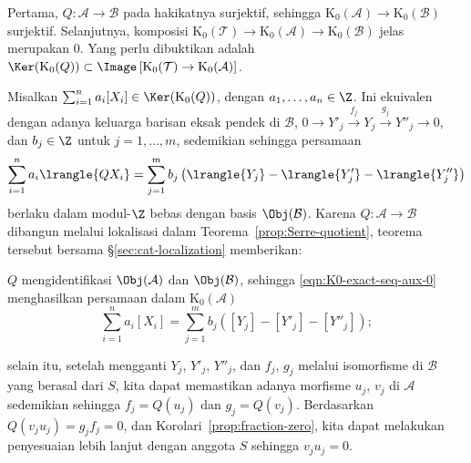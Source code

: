 \begin{bukti}
Pertama, $Q:\mathcal{A}\to\mathcal{B}$ pada hakikatnya surjektif, sehingga
$\mathrm{K}_0(\mathcal{A})\to\mathrm{K}_0(\mathcal{B})$ surjektif.
Selanjutnya, komposisi
$\mathrm{K}_0(\mathcal{T})\to\mathrm{K}_0(\mathcal{A})
\to\mathrm{K}_0(\mathcal{B})$ jelas merupakan $0$. Yang perlu dibuktikan adalah
$\Ker(\mathrm{K}_0(Q))\subset
\Image\left[\mathrm{K}_0(\mathcal{T})\to
\mathrm{K}_0(\mathcal{A})\right]$.

Misalkan $\sum_{i=1}^n a_i[X_i]\in\Ker(\mathrm{K}_0(Q))$, dengan
$a_1,\ldots,a_n\in\Z$. Ini ekuivalen dengan adanya keluarga barisan eksak
pendek di $\mathcal{B}$,
$0\to Y'_j\xrightarrow{f_j}Y_j\xrightarrow{g_j}Y''_j\to0$,
dan $b_j\in\Z$ untuk $j=1,\ldots,m$, sedemikian sehingga persamaan
\begin{equation}\label{eqn:K0-exact-seq-aux-0}
\sum_{i=1}^n a_i\lrangle{QX_i}
=\sum_{j=1}^m b_j
\left(\lrangle{Y_j}-\lrangle{Y'_j}-\lrangle{Y''_j}\right)
\end{equation}
berlaku dalam modul-$\Z$ bebas dengan basis $\Obj(\mathcal{B})$.
Karena $Q:\mathcal{A}\to\mathcal{B}$ dibangun melalui lokalisasi dalam
Teorema~\ref{prop:Serre-quotient}, teorema tersebut bersama
\S\ref{sec:cat-localization} memberikan:
\begin{compactitem}
	\item $Q$ mengidentifikasi $\Obj(\mathcal{A})$ dan
	$\Obj(\mathcal{B})$, sehingga
	\eqref{eqn:K0-exact-seq-aux-0} menghasilkan persamaan dalam
	$\mathrm{K}_0(\mathcal{A})$
	\begin{equation}\label{eqn:K0-exact-seq-aux-1}
	\sum_{i=1}^n a_i[X_i]
	=\sum_{j=1}^m b_j\left([Y_j]-[Y'_j]-[Y''_j]\right);
	\end{equation}
	\item selain itu, setelah mengganti $Y_j$, $Y'_j$, $Y''_j$,
	dan $f_j$, $g_j$ melalui isomorfisme di $\mathcal{B}$ yang berasal dari
	$S$, kita dapat memastikan adanya morfisme
	$u_j$, $v_j$ di $\mathcal{A}$ sedemikian sehingga
	$f_j=Q(u_j)$ dan $g_j=Q(v_j)$. Berdasarkan
	$Q(v_ju_j)=g_jf_j=0$, dan
	Korolari~\ref{prop:fraction-zero}, kita dapat melakukan penyesuaian lebih
	lanjut dengan anggota $S$ sehingga $v_ju_j=0$.
\end{compactitem}


\end{bukti}
